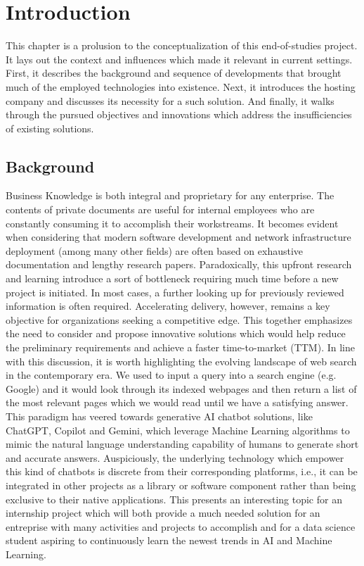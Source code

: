 \chapter{Introduction}
This chapter is a prolusion to the conceptualization of this end-of-studies project. It lays out the context and influences which made it relevant in current settings.\newline
First, it describes the background and sequence of developments that brought much of the employed technologies into existence. Next, it introduces the hosting company and discusses its necessity for a such solution. And finally, it walks through the pursued objectives and innovations which address the insufficiencies of existing solutions.
\newpage

\section{Background}
Business Knowledge is both integral and proprietary for any enterprise. The contents of private documents are useful for internal employees who are constantly consuming it to accomplish their workstreams. It becomes evident when considering that modern software development and network infrastructure deployment (among many other fields) are often based on exhaustive documentation and lengthy research papers. Paradoxically, this upfront research and learning introduce a sort of bottleneck requiring much time before a new project is initiated. In most cases, a further looking up for previously reviewed information is often required. Accelerating delivery, however, remains a key objective for organizations seeking a competitive edge. This together emphasizes the need to consider and propose innovative solutions which would help reduce the preliminary requirements and achieve a faster time-to-market (TTM).\medskip\newline
In line with this discussion, it is worth highlighting the evolving landscape of web search in the contemporary era. We used to input a query into a search engine (e.g. Google) and it would look through its indexed webpages and then return a list of the most relevant pages which we would read until we have a satisfying answer. This paradigm has veered towards generative AI chatbot solutions, like ChatGPT, Copilot and Gemini, which leverage Machine Learning algorithms to mimic the natural language understanding capability of humans to generate short and accurate answers.\smallskip\newline
Auspiciously, the underlying technology which empower this kind of chatbots is discrete from their corresponding platforms, i.e., it can be integrated in other projects as a library or software component rather than being exclusive to their native applications. This presents an interesting topic for an internship project which will both provide a much needed solution for an entreprise with many activities and projects to accomplish and for a data science student aspiring to continuously learn the newest trends in AI and Machine Learning.
\newpage


